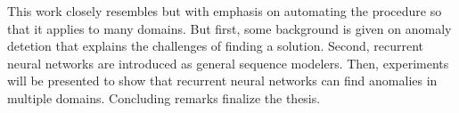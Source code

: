This work closely resembles \cite{Malhotra2015} but with emphasis on automating the procedure so that it applies to many domains. But first, some background is given on anomaly detetion that explains the challenges of finding a solution. Second, recurrent neural networks are introduced as general sequence modelers. Then, experiments will be presented to show that recurrent neural networks can find anomalies in multiple domains. Concluding remarks finalize the thesis.


